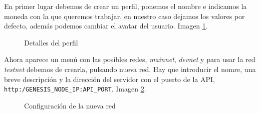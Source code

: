 En primer lugar debemos de crear un perfil, ponemos el nombre e indicamos la moneda con la que queremos trabajar, en nuestro caso dejamos los valores por defecto, además podemos cambiar el avatar del usuario. Imagen \ref{fig:wallet-2}.

\begin{figure}[h]
	\centering
	\caption{Detalles del perfil}
	\label{fig:wallet-2}
\end{figure}

Ahora aparece un menú con las posibles redes, \textit{mainnet}, \textit{devnet} y para usar la red \textit{testnet} debemos de crearla, pulsando nueva red. Hay que introducir el nomre, una breve descripción y la dirección del servidor con el puerto de la API, \texttt{http:/GENESIS\_NODE\_IP:API\_PORT}. Imagen \ref{fig:wallet-3}.

\begin{figure}[h]
	\centering
	\caption{Configuración de la nueva red}
	\label{fig:wallet-3}
\end{figure}

